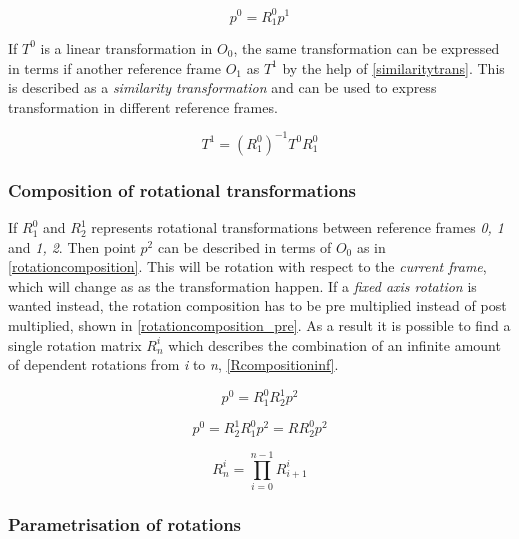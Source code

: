 \begin{equation}\label{pointrotation}
p^0 = R^0_1p^1
\end{equation}

If $T^0$ is a linear transformation in $O_0$, the same transformation can be expressed in terms if another reference frame $O_1$ as $T^1$ by the help of \eqref{similaritytrans}. This is described as a \textit{similarity transformation} and can be used to express transformation in different reference frames.

\begin{equation}\label{similaritytrans}
T^1 = (R^0_1)^{-1}T^0 R^0_1
\end{equation}

\subsubsection{Composition of rotational transformations}

If $R^0_1$ and $R^1_2$ represents rotational transformations between reference frames \textit{0, 1} and \textit{1, 2}. Then point $p^2$ can be described in terms of $O_0$ as in \eqref{rotationcomposition}. This will be rotation with respect to the \textit{current frame}, which will change as as the transformation happen. If a \textit{fixed axis rotation} is wanted instead, the rotation composition has to be pre multiplied instead of post multiplied, shown in \eqref{rotationcomposition_pre}. As a result it is possible to find a single rotation matrix \textit{$R^i_n$} which describes the combination of an infinite amount of dependent rotations from \textit{i} to \textit{n}, \eqref{Rcompositioninf}.


\begin{equation}\label{rotationcomposition}
p^0 = R^0_1 R^1_2 p^2
\end{equation}

\begin{equation}\label{rotationcomposition_pre}
p^0 = R^1_2 R^0_1 p^2 = R R^0_2 p^2
\end{equation}

\begin{equation}\label{Rcompositioninf}
R^i_n = \prod_{i=0}^{n-1} R^i_{i+1}
\end{equation}


\subsubsection{Parametrisation of rotations}

